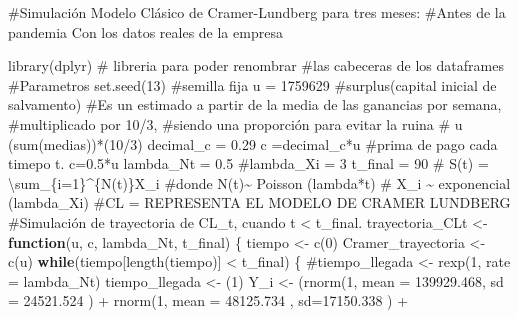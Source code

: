 \documentclass[
  us-letterpaper,
]{scrreprt}
\newenvironment{Shaded}{\begin{snugshade}}{\end{snugshade}}
\newcommand{\AttributeTok}[1]{\textcolor[rgb]{0.40,0.45,0.13}{#1}}
\newcommand{\CommentTok}[1]{\textcolor[rgb]{0.37,0.37,0.37}{#1}}
\newcommand{\ControlFlowTok}[1]{\textcolor[rgb]{0.00,0.23,0.31}{\textbf{#1}}}
\newcommand{\DecValTok}[1]{\textcolor[rgb]{0.68,0.00,0.00}{#1}}
\newcommand{\FloatTok}[1]{\textcolor[rgb]{0.68,0.00,0.00}{#1}}
\newcommand{\FunctionTok}[1]{\textcolor[rgb]{0.28,0.35,0.67}{#1}}
\newcommand{\NormalTok}[1]{\textcolor[rgb]{0.00,0.23,0.31}{#1}}
\newcommand{\OtherTok}[1]{\textcolor[rgb]{0.00,0.23,0.31}{#1}}
\newcommand{\SpecialCharTok}[1]{\textcolor[rgb]{0.37,0.37,0.37}{#1}}
\theoremstyle{definition}
\theoremstyle{plain}
\theoremstyle{plain}
\theoremstyle{remark}
\begin{document}
\begin{Shaded}
\begin{Highlighting}[]
\CommentTok{\#Simulación Modelo Clásico de Cramer{-}Lundberg para tres meses: }
\CommentTok{\#Antes de la pandemia Con los datos reales de la empresa}

\FunctionTok{library}\NormalTok{(dplyr) }\CommentTok{\# libreria para poder renombrar }
\CommentTok{\#las cabeceras de los dataframes}
\CommentTok{\#Parametros}
\FunctionTok{set.seed}\NormalTok{(}\DecValTok{13}\NormalTok{) }\CommentTok{\#semilla fija}
\NormalTok{u }\OtherTok{=} \DecValTok{1759629} \CommentTok{\#surplus(capital inicial de salvamento)}
\CommentTok{\#Es un estimado a partir de la media de las ganancias por semana, }
\CommentTok{\#multiplicado por 10/3, }
\CommentTok{\#siendo una proporción para evitar la ruina}
\CommentTok{\# u (sum(medias))*(10/3)}
\NormalTok{decimal\_c }\OtherTok{=} \FloatTok{0.29}
\NormalTok{c }\OtherTok{=}\NormalTok{decimal\_c}\SpecialCharTok{*}\NormalTok{u }\CommentTok{\#prima de pago cada timepo t. c=0.5*u}
\NormalTok{lambda\_Nt }\OtherTok{=} \FloatTok{0.5}
\CommentTok{\#lambda\_Xi = 3}
\NormalTok{t\_final }\OtherTok{=} \DecValTok{90}
\CommentTok{\# S(t) = \textbackslash{}sum\_\{i=1\}\^{}\{N(t)\}X\_i}
\CommentTok{\#donde N(t)\textasciitilde{} Poisson (lambda*t)}
\CommentTok{\# X\_i \textasciitilde{} exponencial (lambda\_Xi)}
\CommentTok{\#CL = REPRESENTA EL MODELO DE CRAMER LUNDBERG}
\CommentTok{\#Simulación de trayectoria de CL\_t, cuando t \textless{} t\_final.}
\NormalTok{trayectoria\_CLt }\OtherTok{\textless{}{-}} \ControlFlowTok{function}\NormalTok{(u, c, lambda\_Nt, t\_final)}
\NormalTok{\{}
\NormalTok{  tiempo }\OtherTok{\textless{}{-}} \FunctionTok{c}\NormalTok{(}\DecValTok{0}\NormalTok{)}
\NormalTok{  Cramer\_trayectoria }\OtherTok{\textless{}{-}} \FunctionTok{c}\NormalTok{(u)}
  \ControlFlowTok{while}\NormalTok{(tiempo[}\FunctionTok{length}\NormalTok{(tiempo)] }\SpecialCharTok{\textless{}}\NormalTok{ t\_final)}
\NormalTok{  \{}
    \CommentTok{\#tiempo\_llegada \textless{}{-} rexp(1, rate = lambda\_Nt)}
\NormalTok{    tiempo\_llegada }\OtherTok{\textless{}{-}}\NormalTok{ (}\DecValTok{1}\NormalTok{)}
\NormalTok{    Y\_i }\OtherTok{\textless{}{-}}\NormalTok{  (}\FunctionTok{rnorm}\NormalTok{(}\DecValTok{1}\NormalTok{, }\AttributeTok{mean =} \FloatTok{139929.468}\NormalTok{, }\AttributeTok{sd =} \FloatTok{24521.524}\NormalTok{ ) }\SpecialCharTok{+}
            \FunctionTok{rnorm}\NormalTok{(}\DecValTok{1}\NormalTok{, }\AttributeTok{mean =} \FloatTok{48125.734}\NormalTok{ , }\AttributeTok{sd=}\FloatTok{17150.338}\NormalTok{ )    }\SpecialCharTok{+}  

\end{Highlighting}
\end{Shaded}
\end{document}
